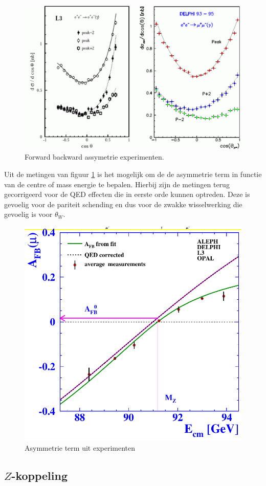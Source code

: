 \documentclass[../main.tex]{subfiles}
\begin{document}
\begin{figure}[h]
    \centering
    \includegraphics[width=0.4\linewidth]{elektroweak_precision_tests/fb_assym.png}
    \caption{Forward backward assymetrie experimenten.}%
    \label{fig:elektroweak_precision_tests/fb_assym}
\end{figure}

Uit de metingen van figuur \ref{fig:elektroweak_precision_tests/fb_assym} is het mogelijk om de de asymmetrie term in functie van de centre of mass energie te bepalen. Hierbij zijn de metingen terug gecorrigeerd voor de QED effecten die in eerste orde kunnen optreden. Deze is gevoelig voor de pariteit schending en dus voor de zwakke wisselwerking die gevoelig is voor $\theta_W$.

\begin{figure}[h]
    \centering
    \includegraphics[width=0.5\linewidth]{elektroweak_precision_tests/fb_term.png}
    \caption{Asymmetrie term uit experimenten}%
    \label{fig:elektroweak_precision_tests/fb_term}
\end{figure}

\subsection{$Z$-koppeling}%
\label{sub:_z_koppeling}
\end{document}
